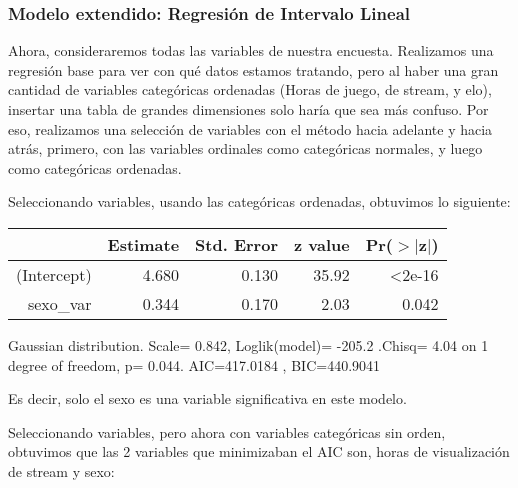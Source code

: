 \documentclass[11pt]{article}
\begin{document}
\newpage

\subsubsection{Modelo extendido: Regresión de Intervalo Lineal}

Ahora, consideraremos todas las variables de nuestra encuesta. Realizamos una regresión base para ver con qué datos estamos tratando, pero al haber una gran cantidad de variables categóricas ordenadas (Horas de juego, de stream, y elo), insertar una tabla de grandes dimensiones solo haría que sea más confuso. Por eso, realizamos una selección de variables con el método hacia adelante y hacia atrás, primero, con las variables ordinales como categóricas normales, y luego como categóricas ordenadas.

Seleccionando variables, usando las categóricas ordenadas, obtuvimos lo siguiente:

\begin{center}
\begin{table}[ht]
\centering
\begin{tabular}{rrrrr}
 \hline
& Estimate & Std. Error & z value & Pr($>$$|$z$|$) \\
 \hline
(Intercept)  & 4.680      & 0.130  & 35.92  &<2e-16\\ 
    sexo\_var &   0.344 & 0.170 & 2.03 & 0.042\\
               
    \hline
   \end{tabular}
   \end{table}
\tiny{Gaussian distribution. Scale= 0.842, Loglik(model)= -205.2 .Chisq= 4.04 on 1 degree of freedom, p= 0.044. AIC=417.0184 , BIC=440.9041}
\end{center}   

Es decir, solo el sexo es una variable significativa en este modelo.

Seleccionando variables, pero ahora con variables categóricas sin orden, obtuvimos que las 2 variables que minimizaban el AIC son, horas de visualización de stream y sexo:
\end{document}
